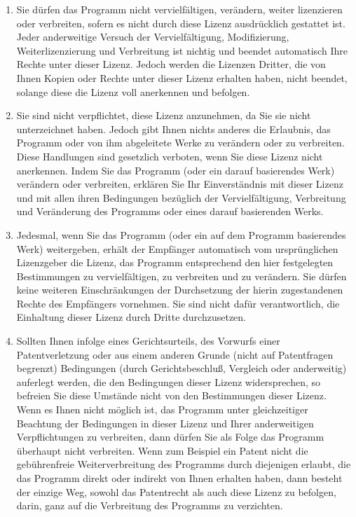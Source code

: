 {\begin{enumerate}
Wenn die Verbreitung eines ausführbaren Programms oder von Objectcode dadurch erfolgt, daß der Kopierzugriff auf eine dafür vorgesehene Stelle gewährt wird, so gilt die Gewährung eines gleichwertigen Kopierzugriffs auf den Quelltext von derselben Stelle als Verbreitung des Quelltextes, auch wenn Dritte nicht dazu gezwungen sind, den Quelltext zusammen mit dem Objectcode zu kopieren.

\item Sie dürfen das Programm nicht vervielfältigen, verändern, weiter lizenzieren oder verbreiten, sofern es nicht durch diese Lizenz ausdrücklich gestattet ist. Jeder anderweitige Versuch der Vervielfältigung, Modifizierung, Weiterlizenzierung und Verbreitung ist nichtig und beendet automatisch Ihre Rechte unter dieser Lizenz. Jedoch werden die Lizenzen Dritter, die von Ihnen Kopien oder Rechte unter dieser Lizenz erhalten haben, nicht beendet, solange diese die Lizenz voll anerkennen und befolgen.

\item  Sie sind nicht verpflichtet, diese Lizenz anzunehmen, da Sie sie nicht unterzeichnet haben. Jedoch gibt Ihnen nichts anderes die Erlaubnis, das Programm oder von ihm abgeleitete Werke zu verändern oder zu verbreiten. Diese Handlungen sind gesetzlich verboten, wenn Sie diese Lizenz nicht anerkennen. Indem Sie das Programm (oder ein darauf basierendes Werk) verändern oder verbreiten, erklären Sie Ihr Einverständnis mit dieser Lizenz und mit allen ihren Bedingungen bezüglich der Vervielfältigung, Verbreitung und Veränderung des Programms oder eines darauf basierenden Werks.

\item  Jedesmal, wenn Sie das Programm (oder ein auf dem Programm basierendes Werk) weitergeben, erhält der Empfänger automatisch vom ursprünglichen Lizenzgeber die Lizenz, das Programm entsprechend den hier festgelegten Bestimmungen zu vervielfältigen, zu verbreiten und zu verändern. Sie dürfen keine weiteren Einschränkungen der Durchsetzung der hierin zugestandenen Rechte des Empfängers vornehmen. Sie sind nicht dafür verantwortlich, die Einhaltung dieser Lizenz durch Dritte durchzusetzen.

\item Sollten Ihnen infolge eines Gerichtsurteils, des Vorwurfs einer Patentverletzung oder aus einem anderen Grunde (nicht auf Patentfragen begrenzt) Bedingungen (durch Gerichtsbeschluß, Vergleich oder anderweitig) auferlegt werden, die den Bedingungen dieser Lizenz widersprechen, so befreien Sie diese Umstände nicht von den Bestimmungen dieser Lizenz. Wenn es Ihnen nicht möglich ist, das Programm unter gleichzeitiger Beachtung der Bedingungen in dieser Lizenz und Ihrer anderweitigen Verpflichtungen zu verbreiten, dann dürfen Sie als Folge das Programm überhaupt nicht verbreiten. Wenn zum Beispiel ein Patent nicht die gebührenfreie Weiterverbreitung des Programms durch diejenigen erlaubt, die das Programm direkt oder indirekt von Ihnen erhalten haben, dann besteht der einzige Weg, sowohl das Patentrecht als auch diese Lizenz zu befolgen, darin, ganz auf die Verbreitung des Programms zu verzichten.


\end{enumerate}}
